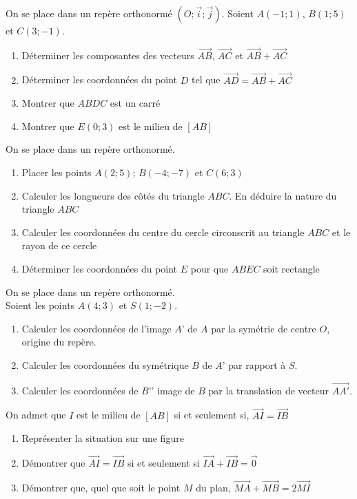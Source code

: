 \begin{exercice}
On se place dans un repère orthonormé $(O;\vec{i};\vec{j})$. Soient $A(-1;1)$, $B(1;5)$ et $C(3;-1)$.
\begin{enumerate}
\item Déterminer les composantes des vecteurs $\overrightarrow{AB}$, $\overrightarrow{AC}$ et $\overrightarrow{AB}+\overrightarrow{AC}$
\item Déterminer les coordonnées du point $D$ tel que $\overrightarrow{AD}=\overrightarrow{AB}+\overrightarrow{AC}$
\item Montrer que $ABDC$ est un carré
\item Montrer que $E(0;3)$ est le milieu de $[AB]$
\end{enumerate}
\end{exercice}

\begin{exercice}
On se place dans un repère orthonormé.\\
\begin{enumerate}
\item Placer les points $A(2;5)$; $B(-4;-7)$ et $C(6;3)$
\item Calculer les longueurs des côtés du triangle $ABC$. En déduire la nature du triangle $ABC$
\item Calculer les coordonnées du centre du cercle circonscrit au triangle $ABC$ et le rayon de ce cercle
\item Déterminer les coordonnées du point $E$ pour que $ABEC$ soit rectangle
\end{enumerate}
\end{exercice}

\begin{exercice}
On se place dans un repère orthonormé.\\
Soient les points $A(4;3)$ et $S(1;-2)$.
\begin{enumerate}
\item Calculer les coordonnées de l’image $A$' de $A$ par la symétrie de centre $O$, origine du repère.
\item Calculer les coordonnées du symétrique $B$ de $A$' par rapport à $S$.
\item Calculer les coordonnées de $B$’’ image de $B$ par la translation de vecteur $\overrightarrow{AA'}$.
\end{enumerate}
\end{exercice}

\begin{exercice}
On admet que $I$ est le milieu de $[AB]$ si et seulement si, $\overrightarrow{AI}=\overrightarrow{IB}$ 
\begin{enumerate}
\item Représenter la situation sur une figure
\item Démontrer que $\overrightarrow{AI}=\overrightarrow{IB}$ si et seulement si $\overrightarrow{IA}+\overrightarrow{IB}=\overrightarrow{0}$
\item Démontrer que, quel que soit le point $M$ du plan, $\overrightarrow{MA}+\overrightarrow{MB}=2\overrightarrow{MI}$
\end{enumerate}
\end{exercice}

